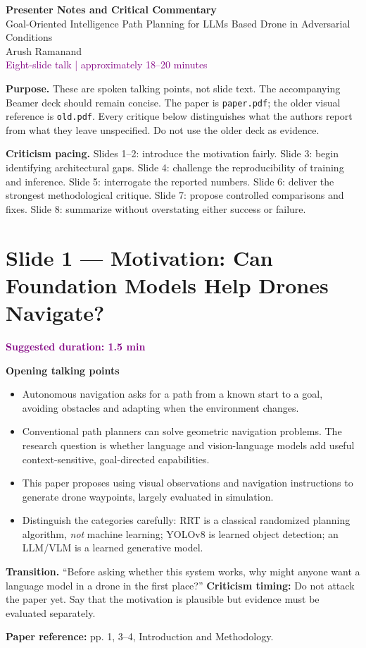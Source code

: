 \documentclass[11pt,a4paper]{article}
\newcommand{\slide}[3]{\clearpage\section*{Slide #1 --- #2}\textcolor{purple}{\textbf{Suggested duration: #3}}\par\medskip}
\newcommand{\source}[1]{\par\small\textcolor{deep}{\textbf{Paper reference:} #1}\normalsize}
\begin{document}
\begin{center}
{\LARGE\bfseries\color{deep} Presenter Notes and Critical Commentary}\\[5pt]
{\large Goal-Oriented Intelligence Path Planning for LLMs Based Drone in Adversarial Conditions}\\[8pt]
{\large Arush Ramanand}\\[4pt]
\textcolor{purple}{Eight-slide talk | approximately 18--20 minutes}
\end{center}
\vspace{5mm}
\textbf{Purpose.} These are spoken talking points, not slide text. The accompanying Beamer deck should remain concise. The paper is \texttt{paper.pdf}; the older visual reference is \texttt{old.pdf}. Every critique below distinguishes what the authors report from what they leave unspecified. Do not use the older deck as evidence.

\textbf{Criticism pacing.} Slides 1--2: introduce the motivation fairly. Slide 3: begin identifying architectural gaps. Slide 4: challenge the reproducibility of training and inference. Slide 5: interrogate the reported numbers. Slide 6: deliver the strongest methodological critique. Slide 7: propose controlled comparisons and fixes. Slide 8: summarize without overstating either success or failure.

\slide{1}{Motivation: Can Foundation Models Help Drones Navigate?}{1.5 min}
\textbf{Opening talking points}
\begin{itemize}
\item Autonomous navigation asks for a path from a known start to a goal, avoiding obstacles and adapting when the environment changes.
\item Conventional path planners can solve geometric navigation problems. The research question is whether language and vision-language models add useful context-sensitive, goal-directed capabilities.
\item This paper proposes using visual observations and navigation instructions to generate drone waypoints, largely evaluated in simulation.
\item Distinguish the categories carefully: RRT is a classical randomized planning algorithm, \emph{not} machine learning; YOLOv8 is learned object detection; an LLM/VLM is a learned generative model.
\end{itemize}
\textbf{Transition.} ``Before asking whether this system works, why might anyone want a language model in a drone in the first place?''
\textbf{Criticism timing:} Do not attack the paper yet. Say that the motivation is plausible but evidence must be evaluated separately.
\source{pp. 1, 3--4, Introduction and Methodology.}
\end{document}
